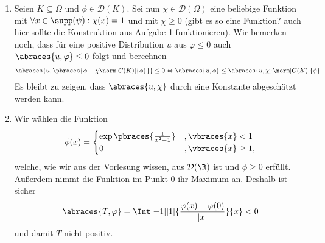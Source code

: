 \begin{solution}
\phantom{}
\begin{enumerate}[label = (\roman*)]
	\item Seien $K \subseteq \Omega$ und $\phi \in \mathcal{D}(K)$. Sei nun $\chi \in \mathcal{D}(\Omega)$ eine beliebige Funktion mit $\forall x \in \supp(\psi): \chi(x) = 1$ und mit $\chi \geq 0$ (gibt es so eine Funktion? auch hier sollte die Konstruktion aus Aufgabe 1 funktionieren). Wir bemerken noch, dass für eine positive Distribution $u$ aus $\varphi \leq 0$ auch $\abraces{u,\varphi} \leq 0$ folgt und berechnen
	\begin{align*}
	\abraces{u, \pbraces{\phi - \chi\norm[C(K)]{\phi}}} \leq 0 \Leftrightarrow \abraces{u, \phi} \leq \abraces{u, \chi} \norm[C(K)]{\phi}
	\end{align*}
	Es bleibt zu zeigen, dass $\abraces{u,\chi}$ durch eine Konstante abgeschätzt werden kann.
	\item Wir wählen die Funktion 
	\begin{align*}
	\phi(x) =
	\begin{cases}
	\exp\pbraces{\frac{1}{x^2 - 1}} &, \vbraces{x} < 1 \\
	0 &, \vbraces{x} \geq 1,
	\end{cases}
	\end{align*}
	welche, wie wir aus der Vorlesung wissen, aus $\mathcal{D}(\R)$ ist und $\phi \geq 0$ erfüllt. Außerdem nimmt die Funktion im Punkt $0$ ihr Maximum an. Deshalb ist sicher
	\begin{align*}
	\abraces{T, \varphi} = \Int[-1][1]
	{
		\frac{\varphi(x) - \varphi(0)}{|x|}
	}{x} < 0 
	\end{align*}
	und damit $T$ nicht positiv.
\end{enumerate}

\end{solution}

